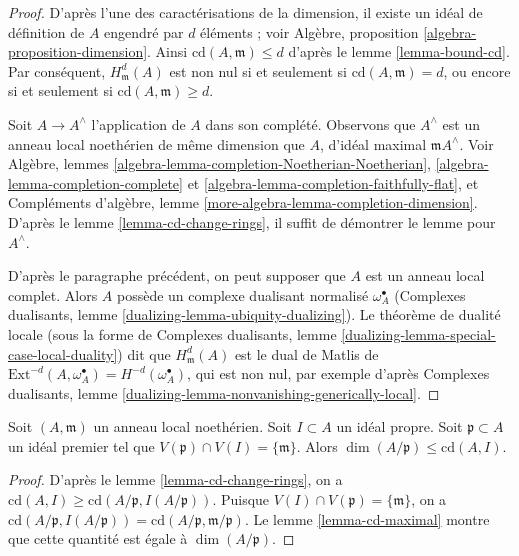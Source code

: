 \begin{proof}
D'après l'une des caractérisations de la dimension, il existe un idéal de définition de $A$ engendré par $d$ éléments ; voir Algèbre, proposition \ref{algebra-proposition-dimension}. Ainsi $\text{cd}(A, \mathfrak m) \leq d$ d'après le lemme \ref{lemma-bound-cd}. Par conséquent, $H^d_\mathfrak m(A)$ est non nul si et seulement si $\text{cd}(A, \mathfrak m) = d$, ou encore si et seulement si $\text{cd}(A, \mathfrak m) \geq d$.

\medskip\noindent
Soit $A \to A^\wedge$ l'application de $A$ dans son complété. Observons que $A^\wedge$ est un anneau local noethérien de même dimension que $A$, d'idéal maximal $\mathfrak m A^\wedge$. Voir Algèbre, lemmes \ref{algebra-lemma-completion-Noetherian-Noetherian}, \ref{algebra-lemma-completion-complete} et \ref{algebra-lemma-completion-faithfully-flat}, et Compléments d'algèbre, lemme \ref{more-algebra-lemma-completion-dimension}. D'après le lemme \ref{lemma-cd-change-rings}, il suffit de démontrer le lemme pour $A^\wedge$.

\medskip\noindent
D'après le paragraphe précédent, on peut supposer que $A$ est un anneau local complet. Alors $A$ possède un complexe dualisant normalisé $\omega_A^\bullet$ (Complexes dualisants, lemme \ref{dualizing-lemma-ubiquity-dualizing}). Le théorème de dualité locale (sous la forme de Complexes dualisants, lemme \ref{dualizing-lemma-special-case-local-duality}) dit que $H^d_\mathfrak m(A)$ est le dual de Matlis de $\text{Ext}^{-d}(A, \omega_A^\bullet) = H^{-d}(\omega_A^\bullet)$, qui est non nul, par exemple d'après Complexes dualisants, lemme \ref{dualizing-lemma-nonvanishing-generically-local}.
\end{proof}

\begin{lemma}
\label{lemma-cd-bound-dim-local}
Soit $(A, \mathfrak m)$ un anneau local noethérien. Soit $I \subset A$ un idéal propre. Soit $\mathfrak p \subset A$ un idéal premier tel que $V(\mathfrak p) \cap V(I) = \{\mathfrak m\}$. Alors $\dim(A/\mathfrak p) \leq \text{cd}(A, I)$.
\end{lemma}

\begin{proof}
D'après le lemme \ref{lemma-cd-change-rings}, on a $\text{cd}(A, I) \geq \text{cd}(A/\mathfrak p, I(A/\mathfrak p))$. Puisque $V(I) \cap V(\mathfrak p) = \{\mathfrak m\}$, on a $\text{cd}(A/\mathfrak p, I(A/\mathfrak p)) =
\text{cd}(A/\mathfrak p, \mathfrak m/\mathfrak p)$. Le lemme \ref{lemma-cd-maximal} montre que cette quantité est égale à $\dim(A/\mathfrak p)$.
\end{proof}

